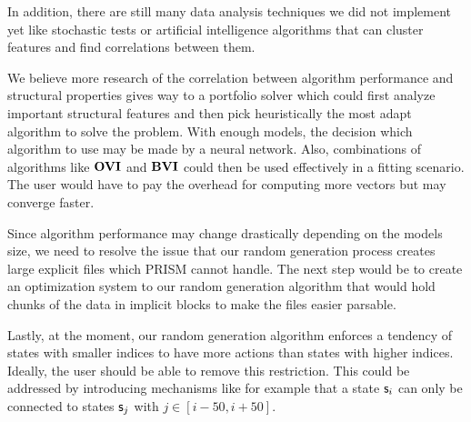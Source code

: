 In addition, there are still many data analysis techniques we did not implement yet like stochastic tests or artificial intelligence algorithms
that can cluster features and find correlations between them. 

We believe more research of the correlation between algorithm performance and structural properties gives way to a portfolio solver which could first
analyze important structural features and then pick heuristically the most adapt algorithm to solve the problem.
With enough models, the decision which algorithm to use may be made by a neural network.
Also, combinations of algorithms like $\mathbf{OVI}$ and $\mathbf{BVI}$ could then be used effectively in a fitting scenario.
The user would have to pay the overhead for computing more vectors but may converge faster.

Since algorithm performance may change drastically depending on the models size,
we need to resolve the issue that our random generation process creates large explicit files which PRISM cannot handle.
The next step would be to create an optimization system to our random generation algorithm that would hold chunks of the data in 
implicit blocks to make the files easier parsable.

Lastly, at the moment, our random generation algorithm enforces a tendency of states with smaller indices to have more actions than states with higher indices.
Ideally, the user should be able to remove this restriction.
This could be addressed by introducing mechanisms like for example that a state $\mathsf{s}_i$ can only be connected to states $\mathsf{s}_{j}$ with $j \in [i-50, i+50]$.